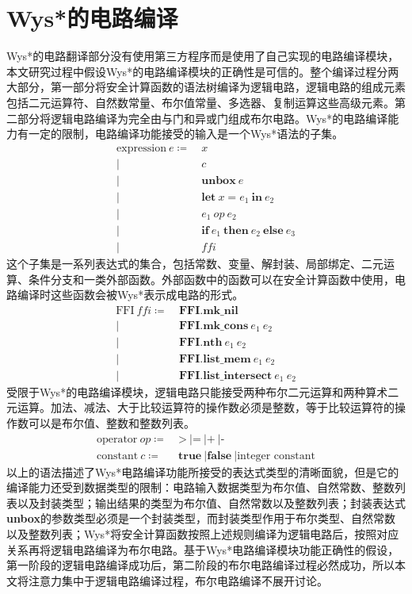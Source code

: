 \section{Wys*的电路编译}\label{trans}
Wys*的电路翻译部分没有使用第三方程序而是使用了自己实现的电路编译模块，本文研究过程中假设Wys*的电路编译模块的正确性是可信的。整个编译过程分两大部分，第一部分将安全计算函数的语法树编译为逻辑电路，逻辑电路的组成元素包括二元运算符、自然数常量、布尔值常量、多选器、复制运算这些高级元素。第二部分将逻辑电路编译为完全由与门和异或门组成布尔电路。Wys*的电路编译能力有一定的限制，电路编译功能接受的输入是一个Wys*语法的子集。
\begin{equation*}
\begin{split}
\text{expression}\ e \coloneqq &\  x \\
\vert &\ c \\
\vert &\ \textbf{unbox}\ e \\
\vert &\  \textbf{let}\  x=e_1\ \textbf{in}\ e_2  \\
\vert &\  e_1\ op\ e_2 \\
\vert &\ \textbf{if}\ e_1 \ \textbf{then}\ e_2 \ \textbf{else}\ e_3 \\
\vert &\ ffi
\end{split}
\end{equation*}
这个子集是一系列表达式的集合，包括常数、变量、解封装、局部绑定、二元运算、条件分支和一类外部函数。外部函数中的函数可以在安全计算函数中使用，电路编译时这些函数会被Wys*表示成电路的形式。
\begin{equation*}
\begin{split}
\text{FFI}\ ffi \coloneqq &\  \textbf{FFI.mk\_nil} \\
\vert &\ \textbf{FFI.mk\_cons}\ e_1\ e_2 \\
\vert &\ \textbf{FFI.nth}\ e_1\ e_2 \\
\vert &\ \textbf{FFI.list\_mem}\ e_1\ e_2 \\
\vert &\ \textbf{FFI.list\_intersect}\ e_1\ e_2 
\end{split}
\end{equation*}
受限于Wys*的电路编译模块，逻辑电路只能接受两种布尔二元运算和两种算术二元运算。加法、减法、大于比较运算符的操作数必须是整数，等于比较运算符的操作数可以是布尔值、整数和整数列表。
\begin{equation*}
\begin{split}
\text{operator}\ op \coloneqq &\  \textbf{>}\ | \textbf{=}\ | \textbf{+}\ | \textbf{-} \\
\text{constant}\ c \coloneqq  &\ \textbf{true}\ | \textbf{false}\ | \text{integer constant} 
\end{split}
\end{equation*}
以上的语法描述了Wys*电路编译功能所接受的表达式类型的清晰面貌，但是它的编译能力还受到数据类型的限制：电路输入数据类型为布尔值、自然常数、整数列表以及封装类型；输出结果的类型为布尔值、自然常数以及整数列表；封装表达式\textbf{unbox}的参数类型必须是一个封装类型，而封装类型作用于布尔类型、自然常数以及整数列表；Wys*将安全计算函数按照上述规则编译为逻辑电路后，按照对应关系再将逻辑电路编译为布尔电路。基于Wys*电路编译模块功能正确性的假设，第一阶段的逻辑电路编译成功后，第二阶段的布尔电路编译过程必然成功，所以本文将注意力集中于逻辑电路编译过程，布尔电路编译不展开讨论。